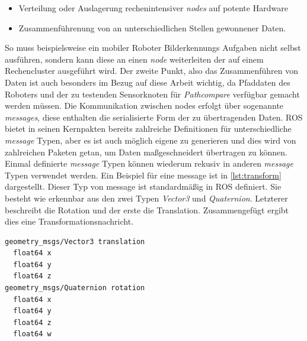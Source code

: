 \begin{itemize}
  \item Verteilung oder Auslagerung rechenintensiver \textit{nodes} auf potente Hardware
  \item Zusammenführenung von an unterschiedlichen Stellen gewonnener Daten.
\end{itemize}

So muss beispielsweise ein mobiler Roboter Bilderkennungs Aufgaben nicht selbst
ausführen, sondern kann diese an einen \textit{node} weiterleiten der auf einem
Rechencluster ausgeführt wird. Der zweite Punkt, also das Zusammenführen von
Daten ist auch besonders im Bezug auf diese Arbeit wichtig, da Pfaddaten des
Roboters und der zu testenden Sensorknoten für \textit{Pathcompare} verfügbar
gemacht werden müssen.  Die Kommunikation zwischen nodes erfolgt über
sogenannte \textit{messages}, diese enthalten die serialisierte Form der zu
übertragenden Daten. ROS bietet in seinen Kernpakten bereits zahlreiche
Definitionen für unterschiedliche \textit{message} Typen, aber es ist auch
möglich eigene zu generieren und dies wird von zahlreichen Paketen getan, um
Daten maßgeschneidert übertragen zu können. Einmal definierte \textit{message}
Typen können wiederum rekusiv in anderen \textit{message} Typen verwendet
werden. Ein Beispiel für eine message ist in \autoref{lst:transform}
dargestellt. Dieser Typ von message ist standardmäßig in ROS definiert.
Sie besteht wie erkennbar aus den zwei Typen \textit{Vector3} und
\textit{Quaternion}. Letzterer beschreibt die Rotation und der erste die
Translation. Zusammengefügt ergibt dies eine Transformationsnachricht.

\begin{lstlisting}[caption=ROS transformation message, label=lst:transform]
geometry_msgs/Vector3 translation
  float64 x
  float64 y
  float64 z
geometry_msgs/Quaternion rotation
  float64 x
  float64 y
  float64 z
  float64 w
\end{lstlisting}

